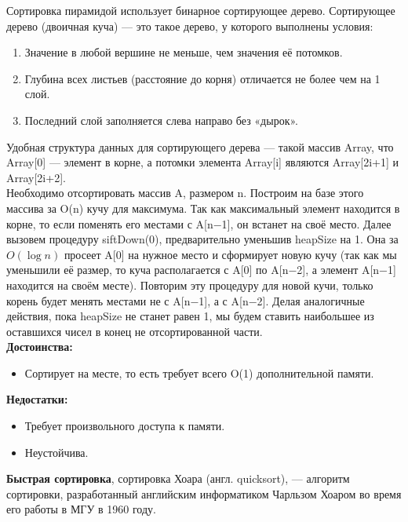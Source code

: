 \documentclass[12pt, a4paper]{article}
\begin{document}
Сортировка пирамидой использует бинарное сортирующее дерево. Сортирующее дерево (двоичная куча) — это такое дерево, у которого выполнены условия:

\begin{enumerate}
    \item Значение в любой вершине не меньше, чем значения её потомков.
    \item Глубина всех листьев (расстояние до корня) отличается не более чем на 1 слой.
    \item Последний слой заполняется слева направо без «дырок».
\end{enumerate}

Удобная структура данных для сортирующего дерева — такой массив Array, что Array[0] — элемент в корне, а потомки элемента Array[i] являются Array[2i+1] и Array[2i+2].\\

Необходимо отсортировать массив A, размером n. Построим на базе этого массива за O(n) кучу для максимума. Так как максимальный элемент находится в корне, то если поменять его местами с A[n−1], он встанет на своё место. Далее вызовем процедуру siftDown(0), предварительно уменьшив heapSize на 1. Она за ${\displaystyle O(\log n)}$ просеет A[0] на нужное место и сформирует новую кучу (так как мы уменьшили её размер, то куча располагается с A[0] по A[n−2], а элемент A[n−1] находится на своём месте). Повторим эту процедуру для новой кучи, только корень будет менять местами не с A[n−1], а с A[n−2]. Делая аналогичные действия, пока heapSize не станет равен 1, мы будем ставить наибольшее из оставшихся чисел в конец не отсортированной части.\\

\textbf{Достоинства: }

\begin{itemize}
     доказанную оценку худшего случая ${\displaystyle O(n\cdot \log n)}$.
    \item Сортирует на месте, то есть требует всего O(1) дополнительной памяти.
\end{itemize}

\textbf{Недостатки: }

\begin{itemize}
    \item Требует произвольного доступа к памяти.
    \item Неустойчива.
\end{itemize}

\textbf{Быстрая сортировка}, сортировка Хоара (англ. quicksort), — алгоритм сортировки, разработанный английским информатиком Чарльзом Хоаром во время его работы в МГУ в 1960 году.\\
\end{document}
